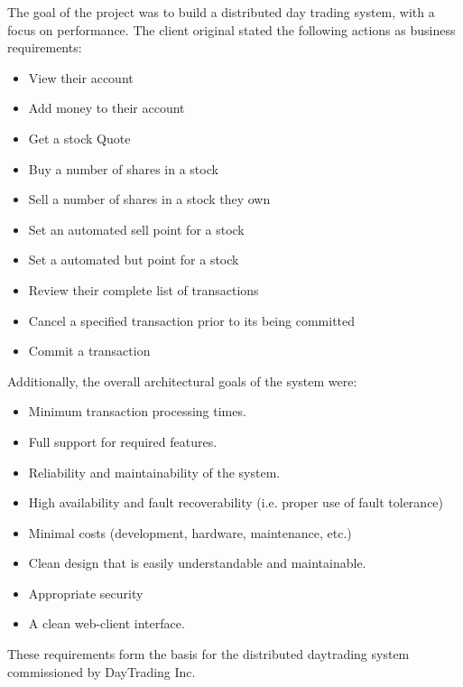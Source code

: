 \begin{Overview}

The goal of the project was to build a distributed day trading system, with a focus on performance. The client original stated the following actions as business requirements:

\begin{itemize}
  \item View their account
  \item Add money to their account
  \item Get a stock Quote
  \item Buy a number of shares in a stock
  \item Sell a number of shares in a stock they own
  \item Set an automated sell point for a stock
  \item Set a automated but point for a stock
  \item Review their complete list of transactions
  \item Cancel a specified transaction prior to its being committed
  \item Commit a transaction
\end{itemize} 

Additionally, the overall architectural goals of the system were:
\begin{itemize}
  \item Minimum transaction processing times. 
  \item Full support for required features. 
  \item Reliability and maintainability of the system. 
  \item High availability and fault recoverability (i.e. proper use of fault tolerance) 
  \item Minimal costs (development, hardware, maintenance, etc.) 
  \item Clean design that is easily understandable and maintainable. 
  \item Appropriate security 
  \item A clean web-client interface. 
\end{itemize}

These requirements form the basis for the distributed daytrading system commissioned by DayTrading Inc.


\end{Overview}

